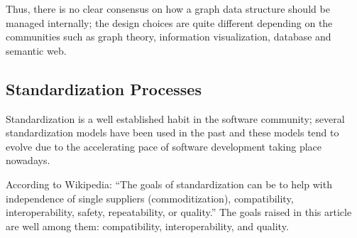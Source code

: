 Thus, there is no clear consensus on how a graph data structure should
be managed internally; the design choices are quite different
depending on the communities such as graph theory, information
visualization, database and semantic web.


\subsection{Standardization Processes}

Standardization is a well established habit in the software community;
several standardization models have been used in the past and these
models tend to evolve due to the accelerating pace of software
development taking place nowadays.

According to Wikipedia: ``The goals of standardization can be to help
with independence of single suppliers (commoditization),
compatibility, interoperability, safety, repeatability, or quality.''
The goals raised in this article are well among them: compatibility,
interoperability, and quality.

